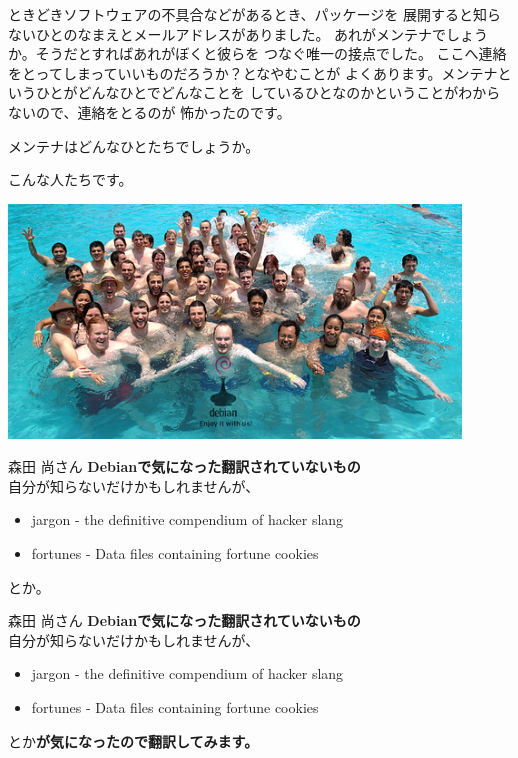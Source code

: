 \documentclass[cjk,dvipdfmx,12pt]{beamer}
\begin{document}
\begin{frame}
ときどきソフトウェアの不具合などがあるとき、パッケージを
展開すると知らないひとのなまえとメールアドレスがありました。
あれがメンテナでしょうか。そうだとすればあれがぼくと彼らを
つなぐ唯一の接点でした。
ここへ連絡をとってしまっていいものだろうか？となやむことが
よくあります。メンテナというひとがどんなひとでどんなことを
しているひとなのかということがわからないので、連絡をとるのが
怖かったのです。

メンテナはどんなひとたちでしょうか。
\end{frame}

\begin{frame}
こんな人たちです。
\begin{center}
\includegraphics[width=12cm]{image200809/debian-swim.jpg}
\end{center}
\end{frame}

\begin{frame}{森田 尚さん}
\textbf{Debianで気になった翻訳されていないもの}\\
自分が知らないだけかもしれませんが、
\begin{itemize}
  \item jargon - the definitive compendium of hacker slang
  \item fortunes - Data files containing fortune cookies
\end{itemize}
とか。
\end{frame}

\begin{frame}{森田 尚さん}
\textbf{Debianで気になった翻訳されていないもの}\\
自分が知らないだけかもしれませんが、
\begin{itemize}
  \item jargon - the definitive compendium of hacker slang
  \item fortunes - Data files containing fortune cookies
\end{itemize}
とか\textbf{が気になったので翻訳してみます。}
\end{frame}
\end{document}
